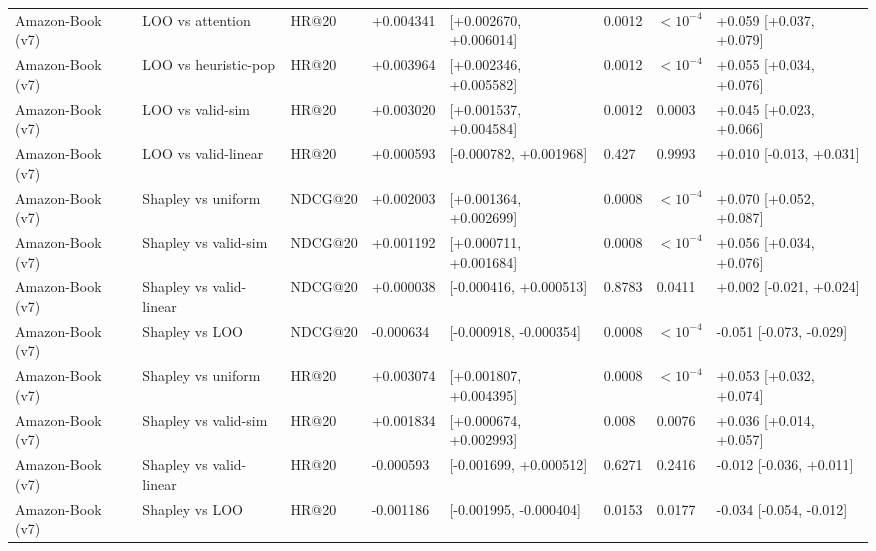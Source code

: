\documentclass[pdflatex,sn-mathphys-num]{sn-jnl}
\begin{document}
\begin{table}[t]
{\begin{tabular}{llllllll}
Amazon-Book (v7) & LOO vs attention & HR@20 & +0.004341 & [+0.002670, +0.006014] & 0.0012 & $<10^{-4}$ & +0.059 [+0.037, +0.079] \\
Amazon-Book (v7) & LOO vs heuristic-pop & HR@20 & +0.003964 & [+0.002346, +0.005582] & 0.0012 & $<10^{-4}$ & +0.055 [+0.034, +0.076] \\
Amazon-Book (v7) & LOO vs valid-sim & HR@20 & +0.003020 & [+0.001537, +0.004584] & 0.0012 & 0.0003 & +0.045 [+0.023, +0.066] \\
Amazon-Book (v7) & LOO vs valid-linear & HR@20 & +0.000593 & [-0.000782, +0.001968] & 0.427 & 0.9993 & +0.010 [-0.013, +0.031] \\
Amazon-Book (v7) & Shapley vs uniform & NDCG@20 & +0.002003 & [+0.001364, +0.002699] & 0.0008 & $<10^{-4}$ & +0.070 [+0.052, +0.087] \\
Amazon-Book (v7) & Shapley vs valid-sim & NDCG@20 & +0.001192 & [+0.000711, +0.001684] & 0.0008 & $<10^{-4}$ & +0.056 [+0.034, +0.076] \\
Amazon-Book (v7) & Shapley vs valid-linear & NDCG@20 & +0.000038 & [-0.000416, +0.000513] & 0.8783 & 0.0411 & +0.002 [-0.021, +0.024] \\
Amazon-Book (v7) & Shapley vs LOO & NDCG@20 & -0.000634 & [-0.000918, -0.000354] & 0.0008 & $<10^{-4}$ & -0.051 [-0.073, -0.029] \\
Amazon-Book (v7) & Shapley vs uniform & HR@20 & +0.003074 & [+0.001807, +0.004395] & 0.0008 & $<10^{-4}$ & +0.053 [+0.032, +0.074] \\
Amazon-Book (v7) & Shapley vs valid-sim & HR@20 & +0.001834 & [+0.000674, +0.002993] & 0.008 & 0.0076 & +0.036 [+0.014, +0.057] \\
Amazon-Book (v7) & Shapley vs valid-linear & HR@20 & -0.000593 & [-0.001699, +0.000512] & 0.6271 & 0.2416 & -0.012 [-0.036, +0.011] \\
Amazon-Book (v7) & Shapley vs LOO & HR@20 & -0.001186 & [-0.001995, -0.000404] & 0.0153 & 0.0177 & -0.034 [-0.054, -0.012] \\
\bottomrule
\end{tabular}
}
\end{table}
\end{document}
